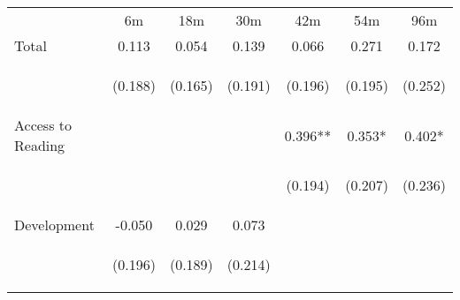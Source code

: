 \begin{tabular}{lcccccc}
\hline \noalign{\smallskip} & 6m & 18m & 30m & 42m & 54m & 96m\\
\noalign{\smallskip}\hline \noalign{\smallskip}Total & 0.113 & 0.054 & 0.139 & 0.066 & 0.271 & 0.172\\
 & \begin{footnotesize}(0.188)\end{footnotesize} & \begin{footnotesize}(0.165)\end{footnotesize} & \begin{footnotesize}(0.191)\end{footnotesize} & \begin{footnotesize}(0.196)\end{footnotesize} & \begin{footnotesize}(0.195)\end{footnotesize} & \begin{footnotesize}(0.252)\end{footnotesize}\\
\noalign{\smallskip}Access to Reading &  &  &  & 0.396** & 0.353* & 0.402*\\
 & \begin{footnotesize}\end{footnotesize} & \begin{footnotesize}\end{footnotesize} & \begin{footnotesize}\end{footnotesize} & \begin{footnotesize}(0.194)\end{footnotesize} & \begin{footnotesize}(0.207)\end{footnotesize} & \begin{footnotesize}(0.236)\end{footnotesize}\\
\noalign{\smallskip}Development & -0.050 & 0.029 & 0.073 &  &  & \\
 & \begin{footnotesize}(0.196)\end{footnotesize} & \begin{footnotesize}(0.189)\end{footnotesize} & \begin{footnotesize}(0.214)\end{footnotesize} & \begin{footnotesize}\end{footnotesize} & \begin{footnotesize}\end{footnotesize} & \begin{footnotesize}\end{footnotesize}\\

\end{tabular}
